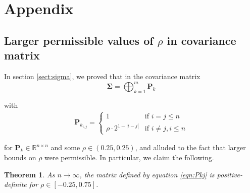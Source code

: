 \documentclass[11pt, letterpaper]{article}
\numberwithin{equation}{section}
\newtheorem{theorem}{Theorem}
\begin{document}
\section{Appendix}
\subsection{Larger permissible values of $\rho$ in covariance matrix}
In section \ref{sect:sigma}, we proved that in the covariance matrix $$\bm \Sigma = \bigoplus^m_{k=1} \bm P_k$$

with 
\begin{align}
\bm P_{k_{i,j}}  = \begin{cases}
1 & \text{if } i = j \leq n \\
\rho \cdot 2 ^{1-|i-j|} & \text{if } i \neq j, i \leq n
\end{cases} \label{eqn:Pkj}
\end{align}

for $\bm P_k \in \mathbb R^{n\times n}$ and some $\rho \in (0.25,0.25)$, and alluded to the fact that larger bounds on $\rho$ were permissible. In particular, we claim the following.

\begin{theorem}
As $n \to \infty$, the matrix defined by equation \ref{eqn:Pkj} is positive-definite for $\rho \in [-0.25, 0.75]$.
\end{theorem}
\end{document}
